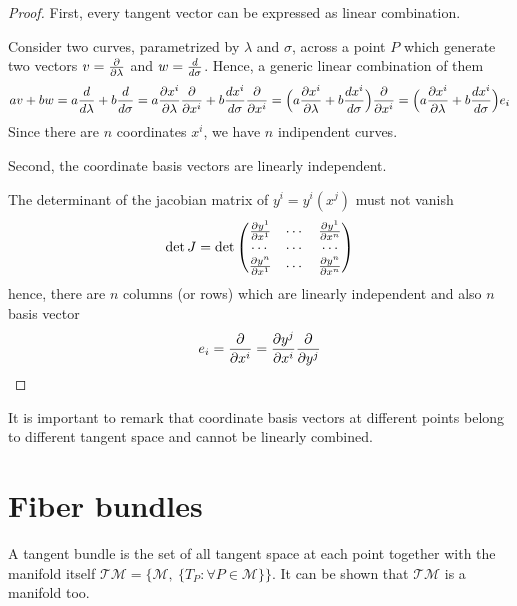     \begin{proof}
    First, every tangent vector can be expressed as linear combination.
    
    Consider two curves, parametrized by $\lambda$ and $\sigma$, across a point $P$ which generate two vectors $v = \frac{\partial}{\partial\lambda}$ and $w = \frac{d}{d\sigma}$. Hence, a generic linear combination of them
    \begin{equation*}
        a v + b w = a \frac{d}{d\lambda} + b \frac{d}{d\sigma} = a \frac{\partial x^i}{\partial\lambda} \frac{\partial}{\partial x^i} + b \frac{dx^i}{d\sigma} \frac{\partial}{\partial x^i} = \Big ( a \frac{\partial x^i}{\partial\lambda} + b \frac{dx^i}{d\sigma} \Big ) \frac{\partial}{\partial x^i} = \Big ( a \frac{\partial x^i}{\partial\lambda} + b \frac{dx^i}{d\sigma} \Big ) e_i
    \end{equation*}
    Since there are $n$ coordinates $x^i$, we have $n$ indipendent curves.

    Second, the coordinate basis vectors are linearly independent. 
    
    The determinant of the jacobian matrix of $y^i = y^i(x^j)$ must not vanish
    \begin{equation*}
        \det J = \det 
        \begin{pmatrix}
            \frac{\partial y^1}{\partial x^1} & \cdots & \frac{\partial y^1}{\partial x^n} \\
            \cdots & \cdots & \cdots \\
            \frac{\partial y^n}{\partial x^1} & \cdots & \frac{\partial y^n}{\partial x^n} \\
        \end{pmatrix}
    \end{equation*}
    hence, there are $n$ columns (or rows) which are linearly independent and also $n$ basis vector
    \begin{equation*}
        e_i = \frac{\partial}{\partial x^i} = \frac{\partial y^j}{\partial x^i} \frac{\partial}{\partial y^j}
    \end{equation*}

    \end{proof}

    It is important to remark that coordinate basis vectors at different points belong to different tangent space and cannot be linearly combined.

\section{Fiber bundles}

    A tangent bundle is the set of all tangent space at each point together with the manifold itself $\mathcal T \mathcal M = \{\mathcal M, ~\{T_P \colon \forall P \in \mathcal M \}\}$. It can be shown that $\mathcal T \mathcal M$ is a manifold too.

